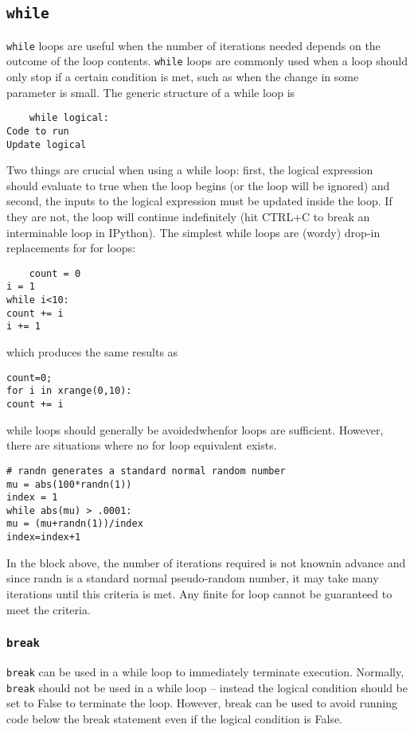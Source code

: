 \documentclass[KSmain.tex]{subfiles}
\begin{document}
\subsection{\texttt{while}}
\texttt{while} loops are useful when the number of iterations needed depends on the outcome of the loop contents.
\texttt{while} loops are commonly used when a loop should only stop if a certain condition is met, such as
when the change in some parameter is small. The generic structure of a while loop is
\begin{framed}
	\begin{verbatim}
	while logical:
Code to run
Update logical
\end{verbatim}
\end{framed}
Two things are crucial when using a while loop: first, the logical expression should evaluate to true
when the loop begins (or the loop will be ignored) and second, the inputs to the logical expression must
be updated inside the loop. If they are not, the loop will continue indefinitely (hit CTRL+C to break an
interminable loop in IPython). The simplest while loops are (wordy) drop-in replacements for for loops:
\begin{framed}
	\begin{verbatim}
	count = 0
i = 1
while i<10:
count += i
i += 1
\end{verbatim}
\end{framed}
which produces the same results as
\begin{framed}
	\begin{verbatim}
count=0;
for i in xrange(0,10):
count += i
\end{verbatim}
\end{framed}
while loops should generally be avoidedwhenfor loops are sufficient. However, there are situations where
no for loop equivalent exists.
\begin{framed}
\begin{verbatim}
# randn generates a standard normal random number
mu = abs(100*randn(1))
index = 1
while abs(mu) > .0001:
mu = (mu+randn(1))/index
index=index+1
\end{verbatim}
\end{framed}
In the block above, the number of iterations required is not knownin advance and since randn is a standard
normal pseudo-random number, it may take many iterations until this criteria is met. Any finite for loop
cannot be guaranteed to meet the criteria.
\subsubsection*{\texttt{break}}
\texttt{break} can be used in a while loop to immediately terminate execution. Normally,\texttt{ break} should not be
used in a while loop – instead the logical condition should be set to False to terminate the loop. However,
break can be used to avoid running code below the break statement even if the logical condition is False.
\end{document}
